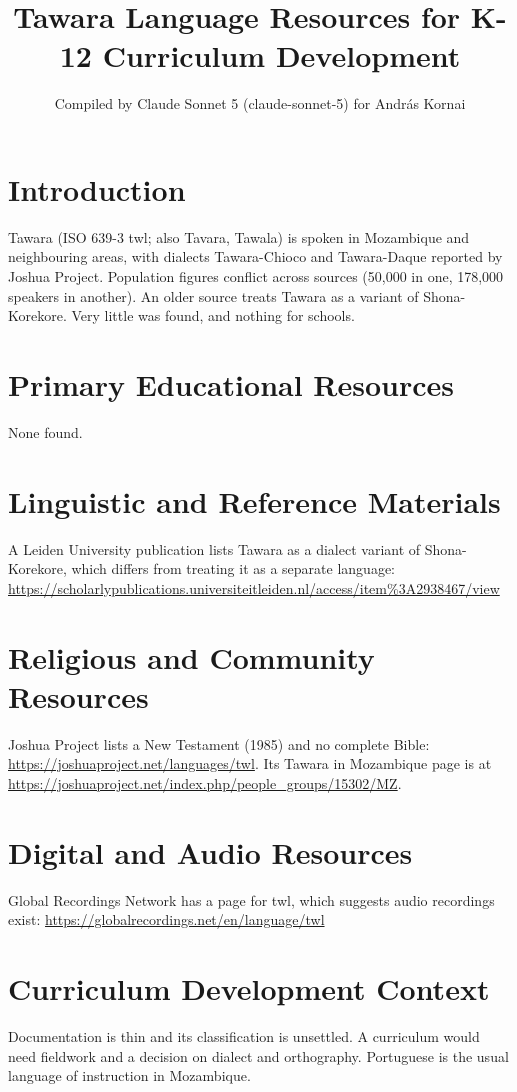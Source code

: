 \documentclass[12pt]{article}
\title{Tawara Language Resources for K-12 Curriculum Development}
\author{Compiled by Claude Sonnet 5 (claude-sonnet-5) for Andr\'as Kornai}
\date{}
\begin{document}
\maketitle

\section{Introduction}
Tawara (ISO 639-3 twl; also Tavara, Tawala) is spoken in Mozambique and neighbouring areas, with dialects Tawara-Chioco and Tawara-Daque reported by Joshua Project. Population figures conflict across sources (50,000 in one, 178,000 speakers in another). An older source treats Tawara as a variant of Shona-Korekore. Very little was found, and nothing for schools.

\section{Primary Educational Resources}
None found.

\section{Linguistic and Reference Materials}
A Leiden University publication lists Tawara as a dialect variant of Shona-Korekore, which differs from treating it as a separate language: \url{https://scholarlypublications.universiteitleiden.nl/access/item%3A2938467/view}

\section{Religious and Community Resources}
Joshua Project lists a New Testament (1985) and no complete Bible: \url{https://joshuaproject.net/languages/twl}. Its Tawara in Mozambique page is at \url{https://joshuaproject.net/index.php/people_groups/15302/MZ}.

\section{Digital and Audio Resources}
Global Recordings Network has a page for twl, which suggests audio recordings exist: \url{https://globalrecordings.net/en/language/twl}

\section{Curriculum Development Context}
Documentation is thin and its classification is unsettled. A curriculum would need fieldwork and a decision on dialect and orthography. Portuguese is the usual language of instruction in Mozambique.
\end{document}
